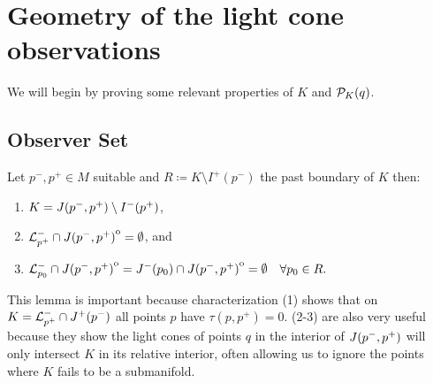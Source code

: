 \section{Geometry of the light cone observations}
We will begin by proving some relevant properties of $K$ and ${\mathcal{P}}_K(q)$.
\subsection{Observer Set}
\begin{lemma}\label{lem:Kcharact}
    Let $p^-,p^+\in M$ suitable and $R\coloneqq  K \setminus I^+(p^-)$ the past boundary of $K$ then:
    \begin{enumerate}[label={\textnormal{(\arabic*)}}]
        \item $K=J(p^-,p^+)\setminus I^-(p^+)$,
        \item ${\mathcal{L}}^-_{p^+}\cap {\kern0ptJ(p^-,p^+)}^{\mathrm{o}} = \emptyset$, and 
        \item ${\mathcal{L}}^-_{p_0} \cap {\kern0ptJ(p^-,p^+)}^{\mathrm{o}} = J^-(p_0) \cap {\kern0ptJ(p^-,p^+)}^{\mathrm{o}} = \emptyset \quad \forall p_0\in R.$
    \end{enumerate}
\end{lemma}

This lemma is important because characterization (1) shows that on $K={\mathcal{L}}^-_{p^+}\cap J^+(p^-)$ all points $p$ have $\tau(p,p^+)=0$. (2-3) are also very useful because they show the light cones of points $q$ in the interior of $J(p^-,p^+)$ will only intersect $K$ in its relative interior, often allowing us to ignore the points where $K$ fails to be a submanifold. 

